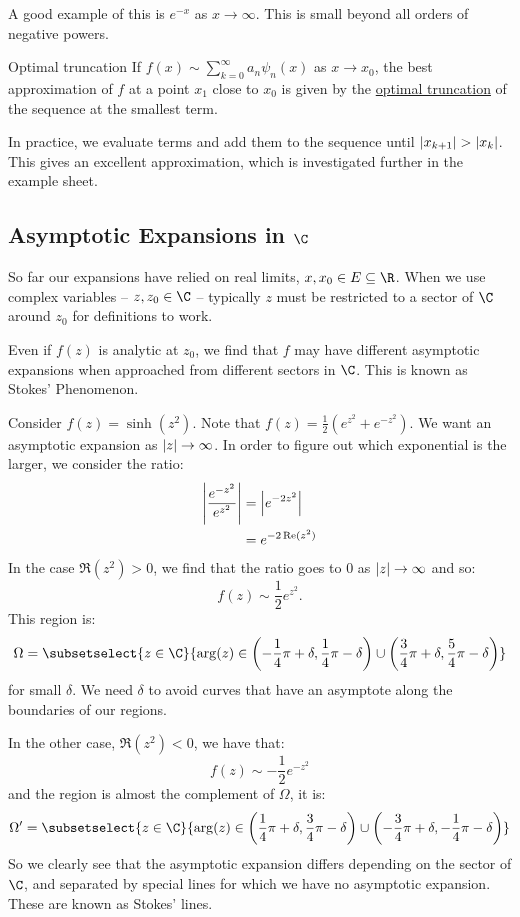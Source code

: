 \documentclass[../Main.tex]{subfiles}
\begin{document}
A good example of this is $e^{-x}$ as $x \to \infty$. This is small beyond all orders of negative powers.
\begin{definition}{Optimal truncation}
    If $f(x) \sim \sum_{k=0}^{\infty} a_n \psi_n(x)$ as $x \to x_0$, the best approximation of $f$ at a point $x_1$ close to $x_0$ is given by the \underline{optimal truncation} of the sequence at the smallest term.
\end{definition}
In practice, we evaluate terms and add them to the sequence until $\left|x_{k+1}\right| > \left|x_k\right|$. This gives an excellent approximation, which is investigated further in the example sheet.
\subsection{Asymptotic Expansions in \texorpdfstring{$\C$}{the Complex Plane}}
So far our expansions have relied on real limits, $x, x_0 \in E \subseteq \R$. When we use complex variables -- $z, z_0 \in \C$ -- typically $z$ must be restricted to a sector of $\C$ around $z_0$ for definitions to work.

Even if $f(z)$ is analytic at $z_0$, we find that $f$ may have different asymptotic expansions when approached from different sectors in $\C$. This is known as Stokes' Phenomenon.
\begin{example}
    Consider $f(z) = \sinh(z^2)$. Note that $f(z) = \frac12 \left(e^{z^2} + e^{-z^2}\right)$. We want an asymptotic expansion as $\left|z\right| \to \infty$. In order to figure out which exponential is the larger, we consider the ratio:
    \begin{align*}
        \left|\frac{e^{-z^2}}{e^{z^2}}\right| &= \left|e^{-2z^2}\right| \\
        &= e^{-2\operatorname{Re}(z^2)}
    \end{align*}
    In the case $\Re(z^2) > 0$, we find that the ratio goes to $0$ as $\left|z\right| \to \infty$ and so:
    \begin{equation*}
        f(z) \sim \frac12 e^{z^2}.
    \end{equation*}
    This region is:
    \begin{equation*}
        \Omega = \subsetselect{z \in \C}{\arg(z) \in \left(-\frac14\pi + \delta, \frac14\pi - \delta\right) \cup \left(\frac34\pi + \delta, \frac54\pi - \delta\right)}
    \end{equation*}
    for small $\delta$. We need $\delta$ to avoid curves that have an asymptote along the boundaries of our regions.

    In the other case, $\Re(z^2) < 0$, we have that:
    \begin{equation*}
        f(z) \sim -\frac12 e^{-z^2}
    \end{equation*}
    and the region is almost the complement of $\Omega$, it is:
    \begin{equation*}
        \Omega' = \subsetselect{z \in \C}{\arg(z) \in \left(\frac14\pi + \delta, \frac34\pi - \delta\right) \cup \left(-\frac34\pi + \delta, -\frac14\pi - \delta\right)}
    \end{equation*}
    So we clearly see that the asymptotic expansion differs depending on the sector of $\C$, and separated by special lines for which we have no asymptotic expansion. These are known as Stokes' lines.
\end{example}
\end{document}
